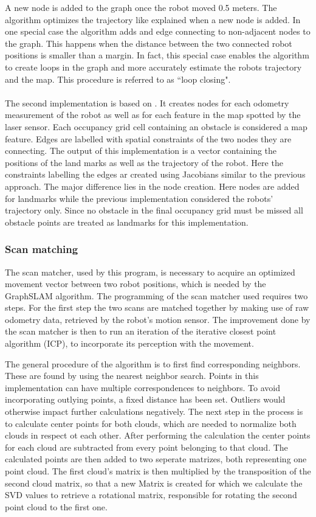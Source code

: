 \documentclass{ba-kecs}
\begin{document}
A new node is added to the graph once the robot moved 0.5 meters. The algorithm optimizes the trajectory like explained when a new node is added. In one special case the algorithm adds and edge connecting to non-adjacent nodes to the graph. This happens when the distance between the two connected robot positions is smaller than a margin. In fact, this special case enables the algorithm to create loops in the graph and more accurately estimate the robots trajectory and the map. This procedure is referred to as ``loop closing". 
\\
\\
The second implementation is based on \cite{Thrun}. It creates nodes for each odometry measurement of the robot as well as for each feature in the map spotted by the laser sensor. Each occupancy grid cell containing an obstacle is considered a map feature. Edges are labelled with spatial constraints of the two nodes they are connecting. The output of this implementation is a vector containing the positions of the land marks as well as the trajectory of the robot. Here the constraints labelling the edges ar created using Jacobians similar to the previous approach. The major difference lies in the node creation. Here nodes are added for landmarks while the previous implementation considered the robots' trajectory only. Since no obstacle in the final occupancy grid must be missed all obstacle points are treated as landmarks for this implementation. 
\subsubsection{Scan matching}

The scan matcher, used by this program, is necessary to acquire an optimized movement vector between two robot positions, which is needed by the GraphSLAM algorithm. The programming of the scan matcher used requires two steps. For the first step the two scans are matched together by making use of raw odometry data, retrieved by the robot's motion sensor. The improvement done by the scan matcher is then to run an iteration of the iterative closest point algorithm (ICP), to incorporate its perception with the movement. 

The general procedure of the algorithm is to first find corresponding neighbors. These are found by using the nearest neighbor search. Points in this implementation can have multiple correspondences to neighbors. To avoid incorporating outlying points, a fixed distance has been set. Outliers would otherwise impact further calculations negatively.
The next step in the process is to calculate center points for both clouds, which are needed to normalize both clouds in respect ot each other. After performing the calculation the center points for each cloud are subtracted from every point belonging to that cloud. The calculated points are then added to two seperate matrizes, both representing one point cloud. The first cloud's matrix is then multiplied by the transposition of the second cloud matrix, so that a new Matrix is created for which we calculate the SVD values to retrieve a rotational matrix, responsible for rotating the second point cloud to the first one.
\end{document}
